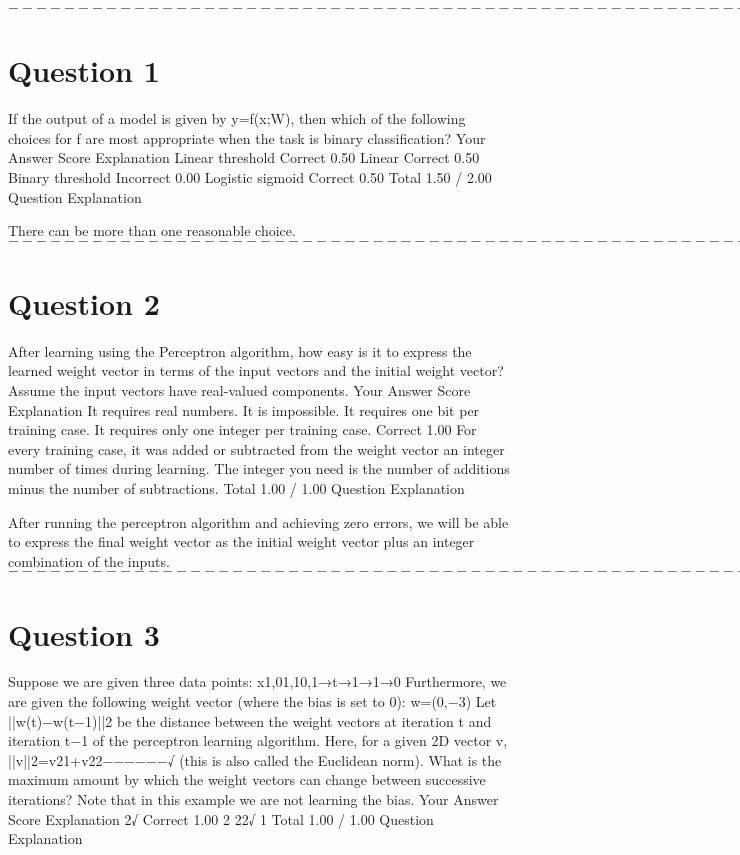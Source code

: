 $----------------------------------------------------------------------------$
\newpage
\section*{Question 1}
If the output of a model is given by y=f(x;W), then which of the following choices for f are most appropriate when the task is binary classification?
Your Answer		Score	Explanation
Linear threshold	Correct	0.50	
Linear	Correct	0.50	
Binary threshold	Incorrect	0.00	
Logistic sigmoid	Correct	0.50	
Total		1.50 / 2.00	
Question Explanation

There can be more than one reasonable choice.
$----------------------------------------------------------------------------$
\newpage
\section*{Question 2}
After learning using the Perceptron algorithm, how easy is it to express the learned weight vector in terms of the input vectors and the initial weight vector? Assume the input vectors have real-valued components.
Your Answer		Score	Explanation
It requires real numbers.			
It is impossible.			
It requires one bit per training case.			
It requires only one integer per training case.	Correct	1.00	
For every training case, it was added or subtracted from the weight vector an integer number of times during learning. 
The integer you need is the number of additions minus the number of subtractions.
Total		1.00 / 1.00	
Question Explanation

After running the perceptron algorithm and achieving zero errors, we will be able to express the final weight vector as the initial weight vector plus an integer combination of the inputs.
$----------------------------------------------------------------------------$
\newpage
\section*{Question 3}
Suppose we are given three data points: 
x1,01,10,1→t→1→1→0 
Furthermore, we are given the following weight vector (where the bias is set to 0): 
w=(0,−3) 
Let ||w(t)−w(t−1)||2 be the distance between the weight vectors at iteration t and iteration t−1 of the perceptron learning algorithm. 
Here, for a given 2D vector v, ||v||2=v21+v22−−−−−−√ (this is also called the Euclidean norm). 
What is the maximum amount by which the weight vectors can change between successive iterations? Note that in this example we are not learning the bias.
Your Answer		Score	Explanation
2√	Correct	1.00	
2			
22√			
1			
Total		1.00 / 1.00	
Question Explanation

